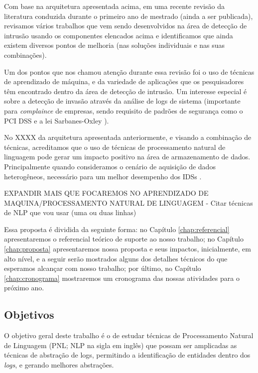 \documentclass[
	12pt,				%
	openright,			%
	twoside,			%
	a4paper,			%
	english,			%
	french,				%
	spanish,			%
	brazil,				%
	]{abntex2}
\begin{document}
Com base na arquitetura apresentada acima, em uma recente revisão da literatura conduzida durante o primeiro ano de mestrado (ainda a ser publicada), revisamos vários trabalhos que vem sendo desenvolvidos na área de detecção de intrusão usando os componentes elencados acima e identificamos que ainda existem diversos pontos de melhoria (nas soluções individuais e nas suas combinações).

Um dos pontos que nos chamou atenção durante essa revisão foi o uso de técnicas de aprendizado de máquina, e da variedade de aplicações que os pesquisadores têm encontrado dentro da área de detecção de intrusão. Um interesse especial é sobre a detecção de invasão através da análise de logs de sistema (importante para \emph{complaince} de empresas, sendo requisito de padrões de segurança como o PCI DSS e a lei Sarbanes-Oxley \cite{prakhar2012log}).

No XXXX da arquitetura apresentada anteriormente, e visando a combinação de técnicas, acreditamos que o uso de técnicas de processamento natural de linguagem pode gerar um impacto positivo na área de armazenamento de dados. Principalmente quando consideramos o cenário de aquisição de dados heterogêneos, necessário para um melhor desempenho dos IDSs \cite{zuech2015intrusion}.

EXPANDIR MAIS QUE FOCAREMOS NO APRENDIZADO DE MAQUINA/PROCESSAMENTO NATURAL DE LINGUAGEM
- Citar técnicas de NLP que vou usar (uma ou duas linhas)

Essa proposta é dividida da seguinte forma: no Capítulo \ref{chap:referencial} apresentaremos o referencial teórico de suporte ao nosso trabalho; no Capítulo \ref{chap:proposta} apresentaremos nossa proposta e seus impactos, inicialmente, em alto nível, e a seguir serão mostrados alguns dos detalhes técnicos do que esperamos alcançar com nosso trabalho; por último, no Capítulo \ref{chap:cronograma} mostraremos um cronograma das nossas atividades para o próximo ano.

\subsection{Objetivos}

O objetivo geral deste trabalho é o de estudar técnicas de Processamento Natural de Linguagem (PNL; NLP na sigla em inglês) que possam ser amplicadas as técnicas de abstração de logs, permitindo a identificação de entidades dentro dos \emph{logs}, e gerando melhores abstrações.
\end{document}
